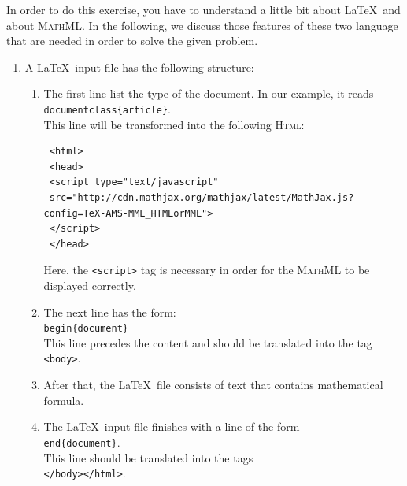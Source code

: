 In order to do this exercise, you have to understand a little bit about \LaTeX\ and about 
\textsc{MathML}.  In the following, we discuss those features of these two language that are needed in order to
solve the given problem.
\begin{enumerate}
\item A \LaTeX\ input file has the following structure:
      \begin{enumerate}
      \item The first line list the type of the document.  In our example, it reads
            \\[0.2cm]
            \hspace*{1.3cm}
            \texttt{documentclass\{article\}}.
            \\[0.2cm]
            This line will be transformed into the following \textsc{Html}:
            \begin{verbatim}
 <html>
 <head>
 <script type="text/javascript"
 src="http://cdn.mathjax.org/mathjax/latest/MathJax.js?config=TeX-AMS-MML_HTMLorMML">
 </script>
 </head>
            \end{verbatim}
            Here, the \texttt{<script>} tag is necessary in order for the \textsc{MathML} 
            to be displayed correctly.
      \item The next line has the form:
            \\[0.2cm]
            \hspace*{1.3cm}
            \texttt{begin\{document\}}
            \\[0.2cm]
            This line precedes the content and should be translated into the tag
            \\[0.2cm]
            \hspace*{1.3cm}
            \texttt{<body>}.
      \item After that, the \LaTeX\ file consists of text that contains mathematical formula.
      \item The \LaTeX\ input file finishes with a line of the form
            \\[0.2cm]
            \hspace*{1.3cm}
            \texttt{end\{document\}}.
            \\[0.2cm]
            This line should be translated into the tags
            \\[0.2cm]
            \hspace*{1.3cm}
            \texttt{</body></html>}.
      \end{enumerate}

\end{enumerate}
